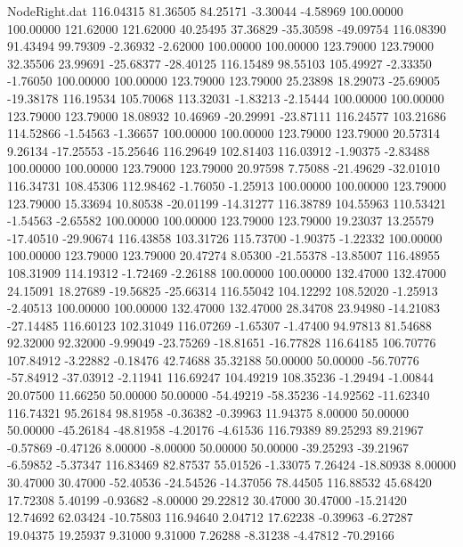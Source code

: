 \begin{filecontents}{NodeRight.dat}
 116.04315   81.36505   84.25171    -3.30044   -4.58969  100.00000  100.00000  121.62000  121.62000   40.25495   37.36829  -35.30598  -49.09754
 116.08390   91.43494   99.79309    -2.36932   -2.62000  100.00000  100.00000  123.79000  123.79000   32.35506   23.99691  -25.68377  -28.40125
 116.15489   98.55103  105.49927    -2.33350   -1.76050  100.00000  100.00000  123.79000  123.79000   25.23898   18.29073  -25.69005  -19.38178
 116.19534  105.70068  113.32031    -1.83213   -2.15444  100.00000  100.00000  123.79000  123.79000   18.08932   10.46969  -20.29991  -23.87111
 116.24577  103.21686  114.52866    -1.54563   -1.36657  100.00000  100.00000  123.79000  123.79000   20.57314    9.26134  -17.25553  -15.25646
 116.29649  102.81403  116.03912    -1.90375   -2.83488  100.00000  100.00000  123.79000  123.79000   20.97598    7.75088  -21.49629  -32.01010
 116.34731  108.45306  112.98462    -1.76050   -1.25913  100.00000  100.00000  123.79000  123.79000   15.33694   10.80538  -20.01199  -14.31277
 116.38789  104.55963  110.53421    -1.54563   -2.65582  100.00000  100.00000  123.79000  123.79000   19.23037   13.25579  -17.40510  -29.90674
 116.43858  103.31726  115.73700    -1.90375   -1.22332  100.00000  100.00000  123.79000  123.79000   20.47274    8.05300  -21.55378  -13.85007
 116.48955  108.31909  114.19312    -1.72469   -2.26188  100.00000  100.00000  132.47000  132.47000   24.15091   18.27689  -19.56825  -25.66314
 116.55042  104.12292  108.52020    -1.25913   -2.40513  100.00000  100.00000  132.47000  132.47000   28.34708   23.94980  -14.21083  -27.14485
 116.60123  102.31049  116.07269    -1.65307   -1.47400   94.97813   81.54688   92.32000   92.32000   -9.99049  -23.75269  -18.81651  -16.77828
 116.64185  106.70776  107.84912    -3.22882   -0.18476   42.74688   35.32188   50.00000   50.00000  -56.70776  -57.84912  -37.03912   -2.11941
 116.69247  104.49219  108.35236    -1.29494   -1.00844   20.07500   11.66250   50.00000   50.00000  -54.49219  -58.35236  -14.92562  -11.62340
 116.74321   95.26184   98.81958    -0.36382   -0.39963   11.94375    8.00000   50.00000   50.00000  -45.26184  -48.81958   -4.20176   -4.61536
 116.79389   89.25293   89.21967    -0.57869   -0.47126    8.00000   -8.00000   50.00000   50.00000  -39.25293  -39.21967   -6.59852   -5.37347
 116.83469   82.87537   55.01526    -1.33075    7.26424  -18.80938    8.00000   30.47000   30.47000  -52.40536  -24.54526  -14.37056   78.44505
 116.88532   45.68420   17.72308     5.40199   -0.93682   -8.00000   29.22812   30.47000   30.47000  -15.21420   12.74692   62.03424  -10.75803
 116.94640    2.04712   17.62238    -0.39963   -6.27287   19.04375   19.25937    9.31000    9.31000    7.26288   -8.31238   -4.47812  -70.29166

\end{filecontents}
